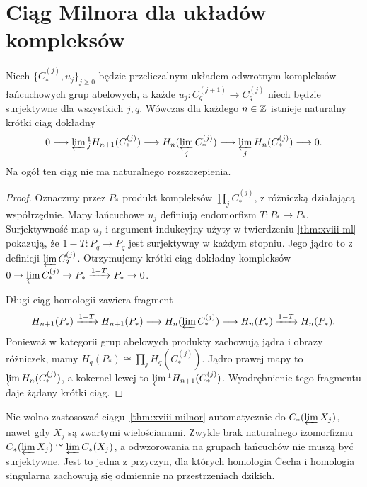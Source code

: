 \section{Ciąg Milnora dla układów kompleksów}
\begin{twierdzenie}
\label{thm:xviii-milnor}
Niech $\{C^{(j)}_*,u_j\}_{j\ge0}$ będzie przeliczalnym
układem odwrotnym kompleksów łańcuchowych grup abelowych,
a każde $u_j:C^{(j+1)}_q\to C^{(j)}_q$ niech będzie
surjektywne dla wszystkich $j,q$. Wówczas dla każdego $n\in\mathbb{Z}$
istnieje naturalny krótki ciąg dokładny
\[
0\longrightarrow\varprojlim{}^1_jH_{n+1}(C^{(j)}_*)
\longrightarrow H_n(\varprojlim_j C^{(j)}_*)
\longrightarrow\varprojlim_jH_n(C^{(j)}_*)
\longrightarrow0.
\]
Na ogół ten ciąg nie ma naturalnego rozszczepienia.
\end{twierdzenie}
\begin{proof}
Oznaczmy przez $P_*$ produkt kompleksów $\prod_j C^{(j)}_*$,
z różniczką działającą współrzędnie. Mapy łańcuchowe $u_j$
definiują endomorfizm $T:P_*\to P_*$. Surjektywność map
$u_j$ i argument indukcyjny użyty w twierdzeniu
\ref{thm:xviii-ml} pokazują, że $1-T:P_q\to P_q$
jest surjektywny w każdym stopniu. Jego jądro to z definicji
$\varprojlim C^{(j)}_q$. Otrzymujemy krótki ciąg dokładny
kompleksów $0\to\varprojlim C^{(j)}_*\to P_*
\xrightarrow{1-T}P_*\to0$.

Długi ciąg homologii zawiera fragment
\[
H_{n+1}(P_*)\xrightarrow{1-T}H_{n+1}(P_*)
\longrightarrow H_n(\varprojlim C^{(j)}_*)
\longrightarrow H_n(P_*)\xrightarrow{1-T}H_n(P_*).
\]
Ponieważ w kategorii grup abelowych produkty zachowują
jądra i obrazy różniczek, mamy
$H_q(P_*)\cong\prod_jH_q(C^{(j)}_*)$.
Jądro prawej mapy to $\varprojlim H_n(C^{(j)}_*)$,
a kokernel lewej to $\varprojlim{}^1 H_{n+1}(C^{(j)}_*)$.
Wyodrębnienie tego fragmentu daje żądany krótki ciąg.
\end{proof}
\begin{uwaga}
Nie wolno zastosować ciągu~\ref{thm:xviii-milnor}
automatycznie do $C_*(\varprojlim X_j)$, nawet gdy
$X_j$ są zwartymi wielościanami. Zwykle brak naturalnego
izomorfizmu $C_*(\varprojlim X_j)\cong\varprojlim C_*(X_j)$,
a odwzorowania na grupach łańcuchów nie muszą być surjektywne.
Jest to jedna z przyczyn, dla których homologia Čecha i homologia
singularna zachowują się odmiennie na przestrzeniach dzikich.
\end{uwaga}

